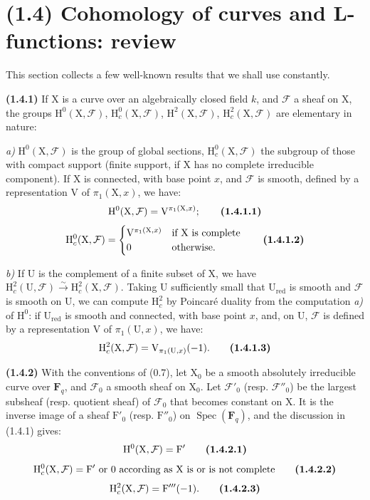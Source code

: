 \documentclass[11pt,leqno]{article}
\begin{document}
\section*{(1.4) Cohomology of curves and L-functions: review}

This section collects a few well-known results that we shall use constantly.

\textbf{(1.4.1)} If \(\mathrm{X}\) is a curve over an algebraically closed field \(k\), and \(\mathcal{F}\) a sheaf on \(\mathrm{X}\), the groups \(\mathrm{H}^0(\mathrm{X},\mathcal{F})\), \(\mathrm{H}_c^0(\mathrm{X},\mathcal{F})\), \(\mathrm{H}^2(\mathrm{X},\mathcal{F})\), \(\mathrm{H}_c^2(\mathrm{X},\mathcal{F})\) are elementary in nature:

\textit{a)} \(\mathrm{H}^0(\mathrm{X},\mathcal{F})\) is the group of global sections, \(\mathrm{H}_c^0(\mathrm{X},\mathcal{F})\) the subgroup of those with compact support (finite support, if \(\mathrm{X}\) has no complete irreducible component). If \(\mathrm{X}\) is connected, with base point \(x\), and \(\mathcal{F}\) is smooth, defined by a representation \(\mathrm{V}\) of \(\pi_1(\mathrm{X},x)\), we have:
\[
\mathrm{H}^0(\mathrm{X},\mathcal{F})=\mathrm{V}^{\pi_1(\mathrm{X},x)};
\tag*{\textbf{(1.4.1.1)}}
\]
\[
\mathrm{H}_c^0(\mathrm{X},\mathcal{F})=
\begin{cases}
\mathrm{V}^{\pi_1(\mathrm{X},x)} & \text{if \(\mathrm{X}\) is complete}\\
0 & \text{otherwise.}
\end{cases}
\tag*{\textbf{(1.4.1.2)}}
\]

\textit{b)} If \(\mathrm{U}\) is the complement of a finite subset of \(\mathrm{X}\), we have \(\mathrm{H}_c^2(\mathrm{U},\mathcal{F})\xrightarrow{\sim}\mathrm{H}_c^2(\mathrm{X},\mathcal{F})\). Taking \(\mathrm{U}\) sufficiently small that \(\mathrm{U}_{\mathrm{red}}\) is smooth and \(\mathcal{F}\) is smooth on \(\mathrm{U}\), we can compute \(\mathrm{H}_c^2\) by Poincaré duality from the computation \textit{a)} of \(\mathrm{H}^0\): if \(\mathrm{U}_{\mathrm{red}}\) is smooth and connected, with base point \(x\), and, on \(\mathrm{U}\), \(\mathcal{F}\) is defined by a representation \(\mathrm{V}\) of \(\pi_1(\mathrm{U},x)\), we have:
\[
\mathrm{H}_c^2(\mathrm{X},\mathcal{F})=\mathrm{V}_{\pi_1(\mathrm{U},x)}(-1).
\tag*{\textbf{(1.4.1.3)}}
\]

\textbf{(1.4.2)} With the conventions of (0.7), let \(\mathrm{X}_0\) be a smooth absolutely irreducible curve over \(\mathbf{F}_q\), and \(\mathcal{F}_0\) a smooth sheaf on \(\mathrm{X}_0\). Let \(\mathcal{F}'_0\) (resp. \(\mathcal{F}''_0\)) be the largest subsheaf (resp. quotient sheaf) of \(\mathcal{F}_0\) that becomes constant on \(\mathrm{X}\). It is the inverse image of a sheaf \(\mathrm{F}'_0\) (resp. \(\mathrm{F}''_0\)) on \(\operatorname{Spec}(\mathbf{F}_q)\), and the discussion in (1.4.1) gives:
\[
\mathrm{H}^0(\mathrm{X},\mathcal{F})=\mathrm{F}'
\tag*{\textbf{(1.4.2.1)}}
\]
\[
\mathrm{H}_c^0(\mathrm{X},\mathcal{F})=\mathrm{F}'\text{ or }0
\text{ according as }\mathrm{X}\text{ is or is not complete}
\tag*{\textbf{(1.4.2.2)}}
\]
\[
\mathrm{H}_c^2(\mathrm{X},\mathcal{F})=\mathrm{F}'''(-1).
\tag*{\textbf{(1.4.2.3)}}
\]
\end{document}
